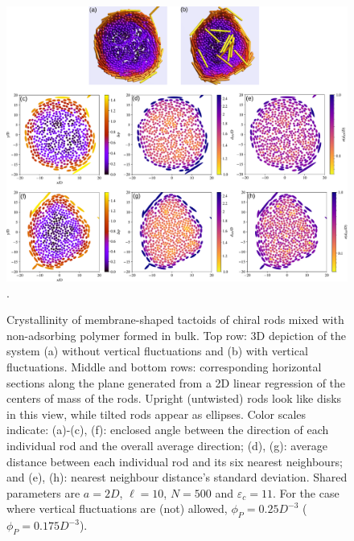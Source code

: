 \begin{figure}
\begin{center}
\includegraphics[width= \columnwidth]{figures/chapter-5/crystallinity_11}.
	\caption{ \label{crystal11} Crystallinity of membrane-shaped tactoids of chiral rods mixed with non-adsorbing polymer formed in bulk. Top row: 3D depiction of the system (a) without vertical fluctuations and (b) with vertical fluctuations. Middle and bottom rows: corresponding horizontal sections along the plane generated from a 2D linear regression of the centers of mass of the rods. Upright (untwisted) rods look like disks in this view, while tilted rods appear as ellipses. Color scales indicate: (a)-(c), (f): enclosed angle between the direction of each individual rod and the overall average direction; (d), (g): average distance between each individual rod and its six nearest neighbours; and (e), (h): nearest neighbour distance's standard deviation. Shared parameters are $a = 2D$, $\ell = 10$, $N = 500$ and $\varepsilon_c=11$. For the case where vertical fluctuations are (not) allowed, $\phi_P=0.25D^{-3}$ ($\phi_P=0.175D^{-3}$).}
\end{center}
\end{figure}


